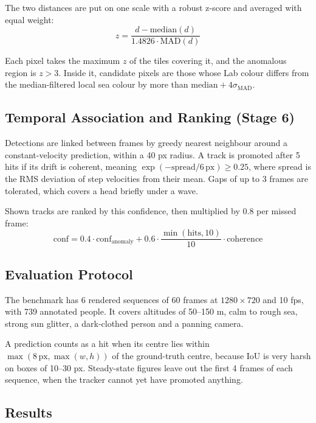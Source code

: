 \documentclass[11pt,a4paper]{article}
\begin{document}
The two distances are put on one scale with a robust z-score and averaged with equal weight:
\begin{equation}
z = \frac{d - \mathrm{median}(d)}{1.4826 \cdot \mathrm{MAD}(d)}
\end{equation}

Each pixel takes the maximum $z$ of the tiles covering it, and the anomalous region is $z > 3$. Inside it, candidate pixels are those whose Lab colour differs from the median-filtered local sea colour by more than $\mathrm{median} + 4\sigma_{\mathrm{MAD}}$.

\subsection{Temporal Association and Ranking (Stage 6)}

Detections are linked between frames by greedy nearest neighbour around a constant-velocity prediction, within a 40 px radius. A track is promoted after 5 hits if its drift is coherent, meaning $\exp(-\mathrm{spread} / 6\,\mathrm{px}) \geq 0.25$, where spread is the RMS deviation of step velocities from their mean. Gaps of up to 3 frames are tolerated, which covers a head briefly under a wave.

Shown tracks are ranked by this confidence, then multiplied by 0.8 per missed frame:
\begin{equation}
\mathrm{conf} = 0.4 \cdot \mathrm{conf}_{\mathrm{anomaly}} + 0.6 \cdot \frac{\min(\mathrm{hits}, 10)}{10} \cdot \mathrm{coherence}
\end{equation}

\subsection{Evaluation Protocol}

The benchmark has 6 rendered sequences of 60 frames at $1280 \times 720$ and 10 fps, with 739 annotated people. It covers altitudes of 50--150 m, calm to rough sea, strong sun glitter, a dark-clothed person and a panning camera.

A prediction counts as a hit when its centre lies within $\max(8\,\mathrm{px}, \max(w, h))$ of the ground-truth centre, because IoU is very harsh on boxes of 10--30 px. Steady-state figures leave out the first 4 frames of each sequence, when the tracker cannot yet have promoted anything.

\subsection{Results}
\end{document}
